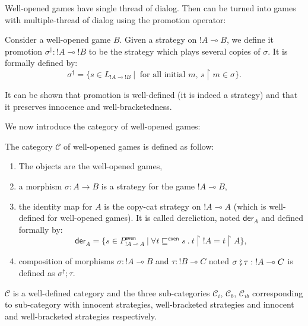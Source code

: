 Well-opened games have single thread of dialog. Then can be turned into games with multiple-thread of dialog
using the promotion operator:

\begin{dfn}[Promotion]
Consider a well-opened game $B$.
Given a strategy on ${!A} \multimap B$, we define it promotion $\sigma^\dagger : {!A} \multimap {!B}$ to be the
strategy which plays several copies of $\sigma$. It is formally defined by:
$$ \sigma^\dagger = \{ s \in L_{{!A} \multimap !B} \ | \ \mbox{ for all initial $m$, } s \upharpoonright m \in \sigma  \}.$$
\end{dfn}

It can be shown that promotion is well-defined (it is indeed a strategy) and that it preserves innocence and
well-bracketedness.


We now introduce the category of well-opened games:
\begin{dfn}
The category $\mathcal{C}$ of well-opened games is defined as follow:
\begin{enumerate}
\item The objects are the well-opened games,
\item a morphism $\sigma : A \rightarrow B$ is a strategy for the game $!A \multimap B$,
\item the identity map for $A$ is the copy-cat strategy on $!A \multimap A$ (which is well-defined for well-opened games).
It is called dereliction, noted
$\textsf{der}_A$ and defined formally by:
$$ \textsf{der}_A = \{ s \in P^{\textsf{even}}_{{!A} \multimap A} \ | \ \forall t \sqsubseteq^{\textsf{even}} s \ . \ t \upharpoonright {!A} = t \upharpoonright A \},$$
\item composition of morphisms $\sigma : {!A} \multimap B$ and $\tau : {!B} \multimap C$
noted $\sigma \fatsemi \tau : {!A} \multimap C$ is defined as $\sigma^\dagger;\tau$.
\end{enumerate}
\end{dfn}
$\mathcal{C}$ is a well-defined category and the three sub-categories
$\mathcal{C}_i$, $\mathcal{C}_b$, $\mathcal{C}_{ib}$ corresponding to sub-category
with innocent strategies, well-bracketed strategies and innocent and well-bracketed strategies respectively.


